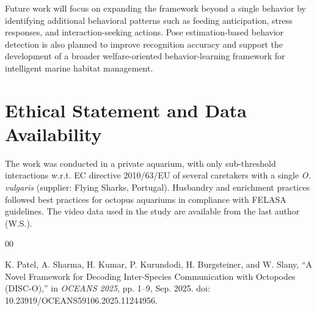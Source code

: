\documentclass[conference]{IEEEtran}
\begin{document}
Future work will focus on expanding the framework beyond a single behavior by identifying additional behavioral patterns such as feeding anticipation, stress responses, and interaction-seeking actions. Pose estimation-based behavior detection is also planned to improve recognition accuracy and support the development of a broader welfare-oriented behavior-learning framework for intelligent marine habitat management.

\section*{Ethical Statement and Data Availability} 
The work was conducted in a private aquarium, with only sub-threshold interactions w.r.t. EC directive 2010/63/EU of several caretakers with a single \emph{O. vulgaris} (supplier: Flying Sharks, Portugal). Husbandry and enrichment practices followed best practices for octopus aquariums in compliance with FELASA guidelines. The video data used in the study are available from the last author (W.S.). 

\begin{thebibliography}{00}

K. Patel, A. Sharma, H. Kumar, P. Kurundodi, H. Burgsteiner, and W. Slany,
``A Novel Framework for Decoding Inter-Species Communication with Octopodes (DISC-O),''
in \textit{OCEANS 2025}, pp. 1--9, Sep. 2025.
doi: 10.23919/OCEANS59106.2025.11244956.

\end{thebibliography}
\end{document}
